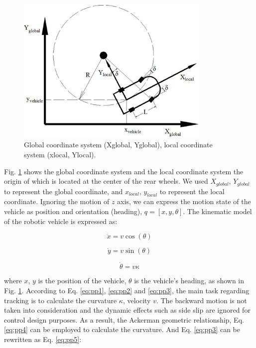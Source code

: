 \begin{figure}[h]
\centering
\includegraphics[height=2.8in]{figs/ch3/purepursuit-cord}
\caption{Global coordinate system (Xglobal, Yglobal), local coordinate system (xlocal, Ylocal).}
\label{fig:purepursuit-cord}
\end{figure}

Fig. \ref{fig:purepursuit-cord} shows the global coordinate system and the local coordinate system the origin of which is located at the center of the rear wheels. We used $X_{global}$, $Y_{global}$ to represent the global coordinate, and $x_{local}$, $y_{local}$ to represent the local coordinate. Ignoring the motion of $z$ axis, we can express the motion state of the vehicle as position and orientation (heading), $q = [x,y,\theta]$. The kinematic model of the robotic vehicle is expressed as:

\begin{equation} \label{eq:pp1}
\dot{x} = v \cos(\theta)
\end{equation}

\begin{equation} \label{eq:pp2}
\dot{y} = v \sin(\theta)
\end{equation}

\begin{equation} \label{eq:pp3}
\dot{\theta} = v \kappa
\end{equation}

where $x$, $y$ is the position of the vehicle, $\theta$ is the vehicle's heading, as shown in Fig. \ref{fig:purepursuit-cord}. According to Eq. \ref{eq:pp1}, \ref{eq:pp2} and \ref{eq:pp3}, the main task regarding tracking is to calculate the curvature $\kappa$, velocity $v$. The backward motion is not taken into consideration and the dynamic effects such as side slip are ignored for control design purposes. As a result, the Ackerman geometric relationship, Eq. \ref{eq:pp4} can be employed to calculate the curvature. And Eq.  \ref{eq:pp3} can be rewritten as Eq. \ref{eq:pp5}:

